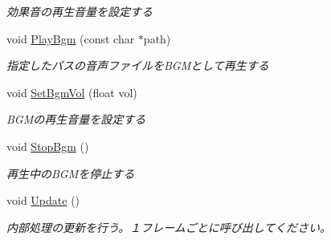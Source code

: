 \begin{DoxyCompactItemize}
\begin{DoxyCompactList}\small\item\em 効果音の再生音量を設定する \end{DoxyCompactList}\item 
void \hyperlink{class_sound_manager_afde94e06c3dfae20a1a5fdac588a39b8}{Play\+Bgm} (const char $\ast$path)\hypertarget{class_sound_manager_afde94e06c3dfae20a1a5fdac588a39b8}{}\label{class_sound_manager_afde94e06c3dfae20a1a5fdac588a39b8}

\begin{DoxyCompactList}\small\item\em 指定したパスの音声ファイルを\+B\+G\+Mとして再生する \end{DoxyCompactList}\item 
void \hyperlink{class_sound_manager_a8bbe5cc935eaeaeedd025c51f1b929a5}{Set\+Bgm\+Vol} (float vol)\hypertarget{class_sound_manager_a8bbe5cc935eaeaeedd025c51f1b929a5}{}\label{class_sound_manager_a8bbe5cc935eaeaeedd025c51f1b929a5}

\begin{DoxyCompactList}\small\item\em B\+G\+Mの再生音量を設定する \end{DoxyCompactList}\item 
void \hyperlink{class_sound_manager_aeb83bb96c5942eebe4c5e7fe4c782e88}{Stop\+Bgm} ()\hypertarget{class_sound_manager_aeb83bb96c5942eebe4c5e7fe4c782e88}{}\label{class_sound_manager_aeb83bb96c5942eebe4c5e7fe4c782e88}

\begin{DoxyCompactList}\small\item\em 再生中の\+B\+G\+Mを停止する \end{DoxyCompactList}\item 
void \hyperlink{class_sound_manager_aaf241621221cdbefeba78e8b6bc29240}{Update} ()\hypertarget{class_sound_manager_aaf241621221cdbefeba78e8b6bc29240}{}\label{class_sound_manager_aaf241621221cdbefeba78e8b6bc29240}

\begin{DoxyCompactList}\small\item\em 内部処理の更新を行う。１フレームごとに呼び出してください。 \end{DoxyCompactList}\end{DoxyCompactItemize}
